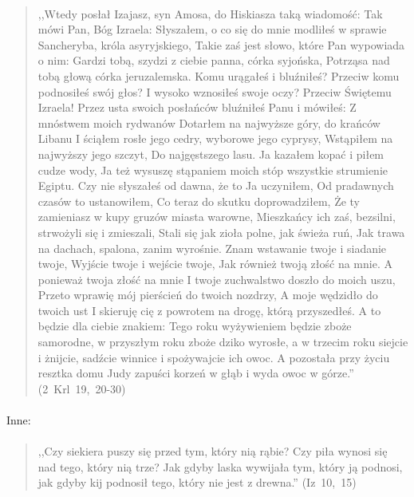 \documentclass[10pt,a4paper,oneside]{article}
\begin{document}
\paragraph{}
\begin{quote}
,,Wtedy posłał Izajasz, syn Amosa, do Hiskiasza taką wiadomość: Tak mówi Pan, Bóg Izraela: Słyszałem, o co się do mnie modliłeś w sprawie Sancheryba, króla asyryjskiego, Takie zaś jest słowo, które Pan wypowiada o nim: Gardzi tobą, szydzi z ciebie panna, córka syjońska, Potrząsa nad tobą głową córka jeruzalemska. Komu urągałeś i bluźniłeś? Przeciw komu podnosiłeś swój głos? I wysoko wznosiłeś swoje oczy? Przeciw Świętemu Izraela! Przez usta swoich posłańców bluźniłeś Panu i mówiłeś: Z mnóstwem moich rydwanów Dotarłem na najwyższe góry, do krańców Libanu I ściąłem rosłe jego cedry, wyborowe jego cyprysy, Wstąpiłem na najwyższy jego szczyt, Do najgęstszego lasu. Ja kazałem kopać i piłem cudze wody, Ja też wysuszę stąpaniem moich stóp wszystkie strumienie Egiptu. Czy nie słyszałeś od dawna, że to Ja uczyniłem, Od pradawnych czasów to ustanowiłem, Co teraz do skutku doprowadziłem, Że ty zamieniasz w kupy gruzów miasta warowne, Mieszkańcy ich zaś, bezsilni, strwożyli się i zmieszali, Stali się jak zioła polne, jak świeża ruń, Jak trawa na dachach, spalona, zanim wyrośnie. Znam wstawanie twoje i siadanie twoje, Wyjście twoje i wejście twoje, Jak również twoją złość na mnie. A ponieważ twoja złość na mnie I twoje zuchwalstwo doszło do moich uszu, Przeto wprawię mój pierścień do twoich nozdrzy, A moje wędzidło do twoich ust I skieruję cię z powrotem na drogę, którą przyszedłeś. A to będzie dla ciebie znakiem: Tego roku wyżywieniem będzie zboże samorodne, w przyszłym roku zboże dziko wyrosłe, a w trzecim roku siejcie i żnijcie, sadźcie winnice i spożywajcie ich owoc. A pozostała przy życiu resztka domu Judy zapuści korzeń w głąb i wyda owoc w górze.'' \mbox{(2 Krl 19, 20-30)}
\end{quote}
\paragraph{}
Inne:
\paragraph{}
\begin{quote}
,,Czy siekiera puszy się przed tym, który nią rąbie? Czy piła wynosi się nad tego, który nią trze? Jak gdyby laska wywijała tym, który ją podnosi, jak gdyby kij podnosił tego, który nie jest z drewna.'' \mbox{(Iz 10, 15)}
\end{quote}
\end{document}
